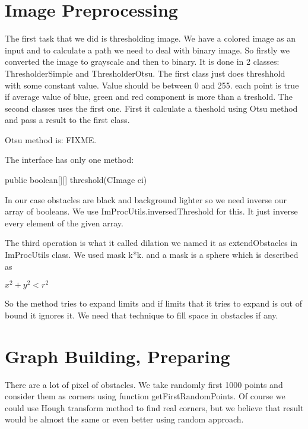 \documentclass[12pt]{article}
\begin{document}
\maketitle

\begin{abstract}
  
\end{abstract}

\section{Image Preprocessing}

The first task that we did is thresholding image. We have a colored image as an input and to calculate a path we need to deal with binary image. So firstly we converted the image to grayscale and then to binary. It is done in 2 classes: ThresholderSimple and ThresholderOtsu. The first class just does threshhold with some constant value. Value should be between 0 and 255. each point is true if average value of blue, green and red component is more than a treshold. The second classes uses the first one. First it calculate a theshold using Otsu method and pass a result to the first class.

Otsu method is: FIXME.

The interface has only one method:

    public boolean[][] threshold(CImage ci)

In our case obstacles are black and background lighter so we need inverse our array of booleans. We use ImProcUtils.inversedThreshold for this. It just inverse every element of the given array.

The third operation is what it called dilation we named it as extendObstacles in ImProcUtils class. We used mask k*k. and a mask is a sphere which is described as

$x^2 + y^2 < r^2$

So the method tries to expand limits and if limits that it tries to expand is out of bound it ignores it. We need that technique to fill space in obstacles if any.

\section{Graph Building, Preparing}

There are a lot of pixel of obstacles. We take randomly first 1000 points and consider them as corners using function getFirstRandomPoints. Of course we could use Hough transform method to find real corners, but we believe that result would be almost the same or even better using random approach.
\end{document}
